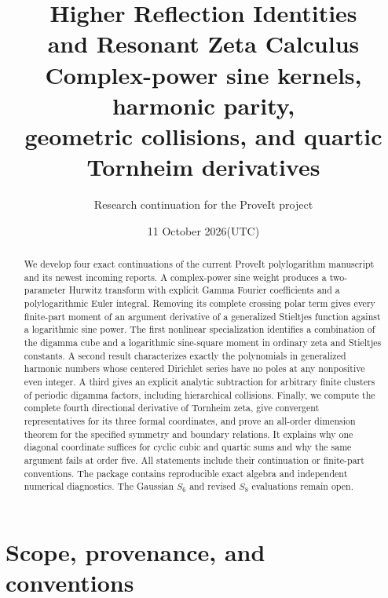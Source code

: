 \documentclass[11pt]{article}
\numberwithin{equation}{section}
\theoremstyle{definition}
\theoremstyle{remark}
\begin{document}
\title{\textbf{Higher Reflection Identities\\and Resonant Zeta Calculus}\\[0.6em]
\large Complex-power sine kernels, harmonic parity,\\
geometric collisions, and quartic Tornheim derivatives}
\author{Research continuation for the ProveIt project}
\date{11 October 2026\quad (UTC)}
\maketitle
\begin{abstract}
We develop four exact continuations of the current ProveIt polylogarithm
manuscript and its newest incoming reports. A complex-power sine weight
produces a two-parameter Hurwitz transform with explicit Gamma Fourier
coefficients and a polylogarithmic Euler integral. Removing its complete
crossing polar term gives every finite-part moment of an argument
derivative of a generalized Stieltjes function against a logarithmic
sine power. The first nonlinear specialization identifies a combination
of the digamma cube and a logarithmic sine-square moment in ordinary
zeta and Stieltjes constants. A second result characterizes exactly the
polynomials in generalized harmonic numbers whose centered Dirichlet
series have no poles at any nonpositive even integer. A third gives an
explicit analytic subtraction for arbitrary finite clusters of periodic
digamma factors, including hierarchical collisions. Finally, we compute
the complete fourth directional derivative of Tornheim zeta, give
convergent representatives for its three formal coordinates, and prove
an all-order dimension theorem for the specified symmetry and boundary
relations. It explains why one diagonal coordinate suffices for cyclic
cubic and quartic sums and why the same argument fails at order five.
All statements include their continuation or finite-part conventions.
The package contains reproducible exact algebra and independent numerical
diagnostics. The Gaussian $S_6$ and revised $S_8$ evaluations remain open.
\end{abstract}
\clearpage
\begingroup
\small
\setlength{\parskip}{0pt}
\tableofcontents
\endgroup
\clearpage
\section{Scope, provenance, and conventions}
\label{sec:scope}
\end{document}
